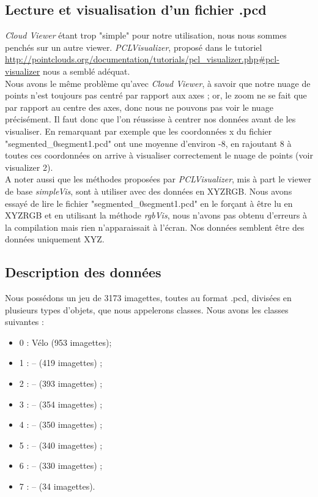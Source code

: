 \subsection{Lecture et visualisation d'un fichier .pcd}

\emph{Cloud Viewer} étant trop "simple" pour notre utilisation, nous nous sommes penchés sur un autre viewer. \emph{PCLVisualizer}, proposé dans le tutoriel \url{http://pointclouds.org/documentation/tutorials/pcl_visualizer.php#pcl-visualizer} nous a semblé adéquat. \\

Nous avons le même problème qu'avec \emph{Cloud Viewer}, à savoir que notre nuage de points n'est toujours pas centré par rapport aux axes ; or, le zoom ne se fait que par rapport au centre des axes, donc nous ne pouvons pas voir le nuage précisément. Il faut donc que l'on réussisse à centrer nos données avant de les visualiser. En remarquant par exemple que les coordonnées x du fichier "segmented\_0segment1.pcd" ont une moyenne d'environ -8, en rajoutant 8 à toutes ces coordonnées on arrive à visualiser correctement le nuage de points (voir visualizer 2). \\

A noter aussi que les méthodes proposées par \emph{PCLVisualizer}, mis à part le viewer de base \textit{simpleVis}, sont à utiliser avec des données en XYZRGB. Nous avons essayé de lire le fichier "segmented\_0segment1.pcd" en le forçant à être lu en XYZRGB et en utilisant la méthode \textit{rgbVis}, nous n'avons pas obtenu d'erreurs à la compilation mais rien n'apparaissait à l'écran. Nos données semblent être des données uniquement XYZ. \\

\subsection{Description des données}

Nous possédons un jeu de 3173 imagettes, toutes au format .pcd, divisées en plusieurs types d'objets, que nous appelerons classes. Nous avons les classes suivantes : \\

\begin {itemize}
\item 0 : Vélo (953 imagettes);
\item 1 : -- (419 imagettes) ;
\item 2 : -- (393 imagettes) ;
\item 3 : -- (354 imagettes) ;
\item 4 : -- (350 imagettes) ;
\item 5 : -- (340 imagettes) ;
\item 6 : -- (330 imagettes) ;
\item 7 : -- (34 imagettes).
\end{itemize}

